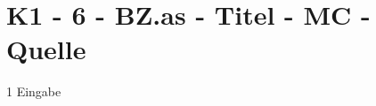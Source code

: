\section{K1 - 6 - BZ.as - Titel - MC - Quelle}

\begin{langesbeispiel} \item[1] %
Eingabe	
\end{langesbeispiel}